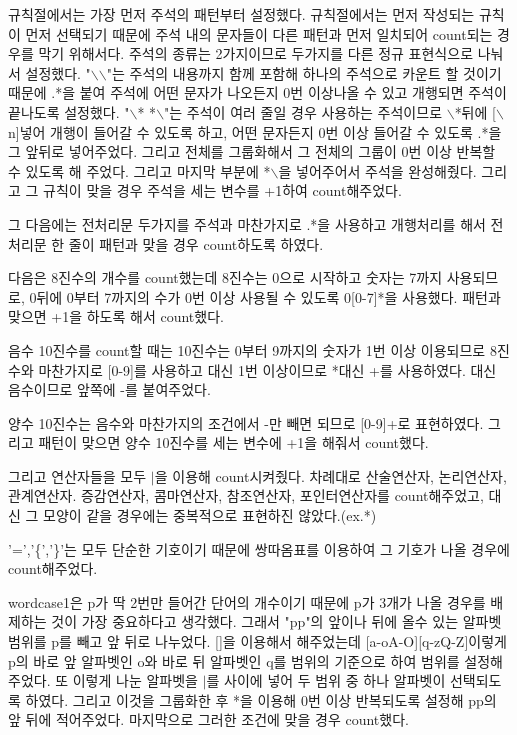 \documentclass{article}
\begin{document}
규칙절에서는 가장 먼저 주석의 패턴부터 설정했다. 규칙절에서는 먼저 작성되는 규칙이 먼저 선택되기 때문에 주석 내의 문자들이 다른 패턴과 먼저 일치되어 count되는 경우를 막기 위해서다. 주석의 종류는 2가지이므로 두가지를 다른 정규 표현식으로 나눠서 설정했다. "$\backslash$$\backslash$"는 주석의 내용까지 함께 포함해 하나의 주석으로 카운트 할 것이기 때문에 .*을 붙여 주석에 어떤 문자가 나오든지 0번 이상나올 수 있고 개행되면 주석이 끝나도록 설정했다. "$\backslash$*  *$\backslash$"는 주석이 여러 줄일 경우 사용하는 주석이므로 $\backslash$*뒤에 [$\backslash$n]넣어 개행이 들어갈 수 있도록 하고, 어떤 문자든지 0번 이상 들어갈 수 있도록 .*을 그 앞뒤로 넣어주었다. 그리고 전체를 그룹화해서 그 전체의 그룹이 0번 이상 반복할 수 있도록 해 주었다. 그리고 마지막 부분에 *$\backslash$을 넣어주어서 주석을 완성해줬다. 그리고 그 규칙이 맞을 경우 주석을 세는 변수를 +1하여 count해주었다.

그 다음에는 전처리문 두가지를 주석과 마찬가지로 .*을 사용하고 개행처리를 해서 전처리문 한 줄이 패턴과 맞을 경우 count하도록 하였다.

다음은 8진수의 개수를 count했는데 8진수는 0으로 시작하고 숫자는 7까지 사용되므로, 0뒤에 0부터 7까지의 수가 0번 이상 사용될 수 있도록 0[0-7]*을 사용했다. 패턴과 맞으면 +1을 하도록 해서 count했다.

음수 10진수를 count할 때는 10진수는 0부터 9까지의 숫자가 1번 이상 이용되므로 8진수와 마찬가지로 [0-9]를 사용하고 대신 1번 이상이므로 *대신 +를 사용하였다. 대신 음수이므로 앞쪽에 -를 붙여주었다.

양수 10진수는 음수와 마찬가지의 조건에서 -만 빼면 되므로 [0-9]+로 표현하였다. 그리고 패턴이 맞으면 양수 10진수를 세는 변수에 +1을 해줘서 count했다.

그리고 연산자들을 모두 $\vert$을 이용해 count시켜줬다. 차례대로 산술연산자, 논리연산자, 관계연산자. 증감연산자, 콤마연산자, 참조연산자, 포인터연산자를 count해주었고, 대신 그 모양이 같을 경우에는 중복적으로 표현하진 않았다.(ex.*)

'=','\{','\}'는 모두 단순한 기호이기 때문에 쌍따옴표를 이용하여 그 기호가 나올 경우에 count해주었다.

wordcase1은 p가 딱 2번만 들어간 단어의 개수이기 때문에 p가 3개가 나올 경우를 배제하는 것이 가장 중요하다고 생각했다. 그래서 "pp"의 앞이나 뒤에 올수 있는 알파벳 범위를 p를 빼고 앞 뒤로 나누었다. []을 이용해서 해주었는데 [a-oA-O][q-zQ-Z]이렇게 p의 바로 앞 알파벳인 o와 바로 뒤 알파벳인 q를 범위의 기준으로 하여 범위를 설정해 주었다. 또 이렇게 나눈 알파벳을 $\vert$를 사이에 넣어 두 범위 중 하나 알파벳이 선택되도록 하였다. 그리고 이것을 그룹화한 후 *을 이용해 0번 이상 반복되도록 설정해 pp의 앞 뒤에 적어주었다. 마지막으로 그러한 조건에 맞을 경우 count했다.
\end{document}
